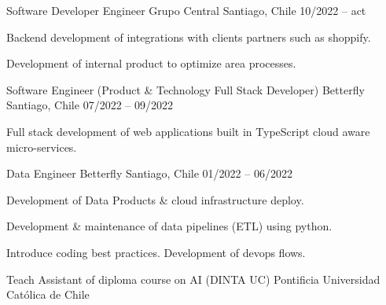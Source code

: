 \begin{cventries}
  \cventry
  {Software Developer Engineer}
  {Grupo Central}
  {Santiago, Chile}
  {10/2022 – act}
  {
    \begin{cvitems} %
      \item {Backend development of integrations with clients partners such as shoppify.}
      \item {Development of internal product to optimize area processes. }
    \end{cvitems}
  }
  \newline
  \cventry
  {Software Engineer (Product \& Technology Full Stack Developer)} %
  {Betterfly} %
  {Santiago, Chile} %
  {07/2022 – 09/2022} %
  {
    \begin{cvitems} %
      \item {Full stack development of web applications built in TypeScript cloud aware micro-services.}
    \end{cvitems}
  }
  \newline
  \cventry
  {Data Engineer} %
  {Betterfly} %
  {Santiago, Chile} %
  {01/2022 – 06/2022} %
  {
    \begin{cvitems} %
      \item {Development of Data Products \& cloud infrastructure deploy.}
      \item {Development \& maintenance of data pipelines (ETL) using python.}
      \item {Introduce coding best practices. Development of devops flows.}
    \end{cvitems}
  }
  \newline
  \cventry
  {Teach Assistant of diploma course on AI (DINTA UC)} %
  {Pontificia Universidad Católica de Chile} %

\end{cventries}
